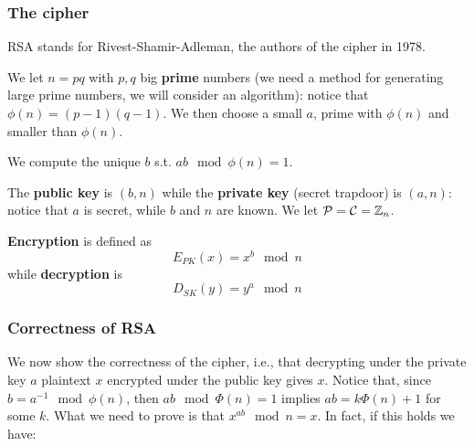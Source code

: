 
\subsubsection{The cipher}
RSA stands for Rivest-Shamir-Adleman, the authors of the cipher in 1978. 

We let $n = pq$ with $p,q$ big \textbf{prime} numbers (we need a method for generating large prime numbers, we will consider an algorithm): notice that $\phi(n) = (p-1)(q-1)$. We then choose a small $a$, prime with $\phi(n)$ and smaller than $\phi(n)$. 


We compute the unique $b$ s.t. $ab \mod \phi(n) = 1$.


The \textbf{public key} is $(b,n)$ while the \textbf{private key} (secret trapdoor) is $(a,n)$: notice that $a$ is secret, while $b$ and $n$ are known. We let ${\cal P}={\cal C} = \mathbb{Z}_n$. 

\textbf{Encryption} is defined as $$E_{PK}(x) = x^{b} \mod n$$ while \textbf{decryption} is $$D_{SK}(y) = y^{a} \mod n$$


\subsubsection{Correctness of RSA}

We now show the correctness of the cipher, i.e., that decrypting under the private key $a$ plaintext $x$ encrypted under the public key gives $x$. Notice that, since $b = a^{-1} \mod \phi(n)$, then $ab \mod \Phi(n) = 1$ implies $ab = k\Phi(n) +1$ for some $k$. What we need to prove is that $x^{ab} \mod n = x$. In fact, if this holds we have:

